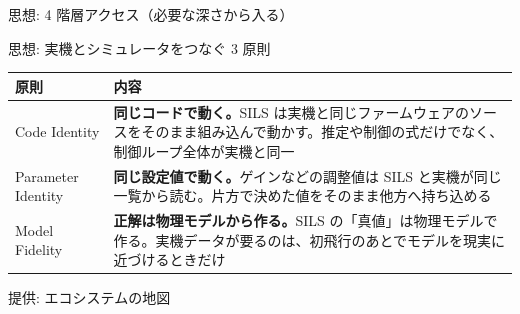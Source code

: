 \begin{frame}{思想: 4 階層アクセス（必要な深さから入る）}
  \centering
  \vspace{-1mm}
  \resizebox{!}{0.82\textheight}{}
\end{frame}

\begin{frame}{思想: 実機とシミュレータをつなぐ 3 原則}
  \begin{table}
    \centering\footnotesize
    \begin{tabular}{lp{100mm}}
      \hline
      \textbf{原則} & \textbf{内容} \\
      \hline
      Code Identity  & \textbf{同じコードで動く。}SILS は実機と同じファームウェアのソースをそのまま組み込んで動かす。推定や制御の式だけでなく、制御ループ全体が実機と同一 \\
      Parameter Identity & \textbf{同じ設定値で動く。}ゲインなどの調整値は SILS と実機が同じ一覧から読む。片方で決めた値をそのまま他方へ持ち込める \\
      Model Fidelity & \textbf{正解は物理モデルから作る。}SILS の「真値」は物理モデルで作る。実機データが要るのは、初飛行のあとでモデルを現実に近づけるときだけ \\
      \hline
    \end{tabular}
  \end{table}
\end{frame}

\begin{frame}{提供: エコシステムの地図}
  \centering
  \vspace{1mm}
  \resizebox{!}{0.78\textheight}{}
\end{frame}

